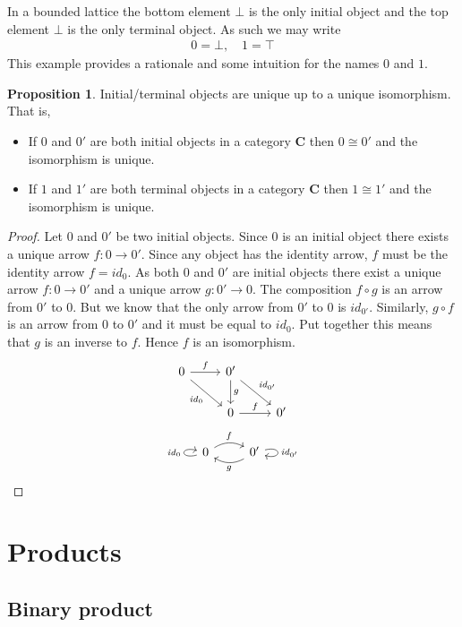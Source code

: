 \documentclass{book}
\theoremstyle{definition}
\newtheorem{proposition}{Proposition}
\newcommand\id{\mathit{id}}
\begin{document}
In a bounded lattice the bottom element $\bot$ is the only initial object and the
top element $\bot$ is the only terminal object. As such we may write
\begin{align*}
  0 = \bot, \quad 1 = \top
\end{align*}
This example provides a rationale and some intuition for the names $0$ and $1$.

\begin{proposition}
  Initial/terminal objects are unique up to a unique isomorphism. That is,
  \begin{itemize}
  \item If $0$ and $0'$ are both initial objects in a category $\mathbf{C}$
    then $0 \cong 0'$ and the isomorphism is unique.
  \item If $1$ and $1'$ are both terminal objects in a category $\mathbf{C}$
    then $1 \cong 1'$ and the isomorphism is unique.
  \end{itemize}
\end{proposition}
\begin{proof}
  Let $0$ and $0'$ be two initial objects. Since $0$ is an initial object there
  exists a unique arrow $f : 0 \to 0'$. Since any object has the identity arrow,
  $f$ must be the identity arrow $f = \id_{0}$. As both $0$ and $0'$ are initial
  objects there exist a unique arrow $f : 0 \to 0'$ and a unique arrow
  $g : 0' \to 0$. The composition $f \circ g$ is an arrow from $0'$ to $0$. But we
  know that the only arrow from $0'$ to $0$ is $\id_{0'}$. Similarly,
  $g \circ f$ is an arrow from $0$ to $0'$ and it must be equal to $\id_{0}$. Put
  together this means that $g$ is an inverse to $f$. Hence $f$ is an
  isomorphism.
  \[
    \begin{tikzcd}
      0 \ar[r, "f"] \ar[dr, "\id_{0}"'] & 0' \ar[d, "g"] \ar[dr, "\id_{0'}"] \\
      & 0 \ar[r, "f"] & 0'
    \end{tikzcd}
  \]
  \[
    \begin{tikzcd}
      0 \ar[r, bend left, "f"] \ar[loop left, "\id_{0}"] & 0' \ar[l, bend left, "g"] \ar[loop right, "\id_{0'}"]
    \end{tikzcd}
  \]
\end{proof}

\section{Products}

\subsection{Binary product}
\end{document}
